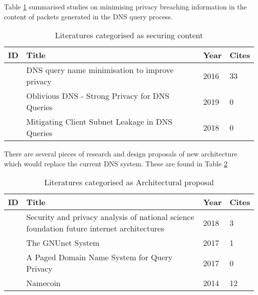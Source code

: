 Table \ref{content} summarised studies on minimising privacy breaching information in the content of packets generated in the DNS query process.

\begin{table}[h!]
    \begin{tabular}{ | l | p{10.5cm} | l | l |}
        \hline
            ID & Title & Year & Cites \\ \hline
            \cite{bortzmeyer2016dns} & DNS query name minimisation to improve privacy & 2016 & 33 \\ \hline
            \cite{annee-dprive-oblivious-dns-00} & Oblivious DNS - Strong Privacy for DNS Queries & 2019 & 0 \\ \hline
            \cite{pan2018mitigating} & Mitigating Client Subnet Leakage in DNS Queries & 2018 & 0 \\ \hline
        \end{tabular}
        \caption{Literatures categorised as securing content}
\label{content}
\end{table}

There are several pieces of research and design proposals of new architecture which would replace the current DNS system. These are found in Table \ref{architectures}

\begin{table}[h!]
    \begin{tabular}{ | l | p{10.5cm} | l | l | }
        \hline
            ID & Title & Year & Cites \\ \hline
            \cite{ambrosin2018security} & Security and privacy analysis of national science foundation future internet architectures & 2018 & 3 \\ \hline
            \cite{grothoff2017gnunet} & The GNUnet System & 2017 & 1 \\ \hline
            \cite{asoni2017paged} & A Paged Domain Name System for Query Privacy & 2017 & 0 \\ \hline
            \cite{loibl2014namecoin} & Namecoin & 2014 & 12 \\ \hline
        \end{tabular}
        \caption{Literatures categorised as Architectural proposal}
    \label{architectures}
\end{table}
\FloatBarrier
